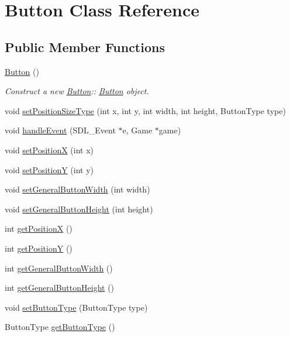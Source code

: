 \hypertarget{class_button}{}\section{Button Class Reference}
\label{class_button}
\subsection*{Public Member Functions}
\begin{DoxyCompactItemize}
\item 
\mbox{\label{class_button_a3b36df1ae23c58aedb9e15a713159459}} 
\mbox{\hyperlink{class_button_a3b36df1ae23c58aedb9e15a713159459}{Button}} ()
\begin{DoxyCompactList}\small\item\em Construct a new \mbox{\hyperlink{class_button}{Button}}\+:\+: \mbox{\hyperlink{class_button}{Button}} object. \end{DoxyCompactList}\item 
void \mbox{\hyperlink{class_button_a3abfce268def79881b95d7286a69ec19}{set\+Position\+Size\+Type}} (int x, int y, int width, int height, Button\+Type type)
\item 
void \mbox{\hyperlink{class_button_aa05597e01e195bb5901fc206bc0938a3}{handle\+Event}} (S\+D\+L\+\_\+\+Event $\ast$e, Game $\ast$game)
\item 
void \mbox{\hyperlink{class_button_addeed0141de6e58e0c5f94a4443f7103}{set\+PositionX}} (int x)
\item 
void \mbox{\hyperlink{class_button_a05e92fd7e167df2301247cc022d2694d}{set\+PositionY}} (int y)
\item 
void \mbox{\hyperlink{class_button_a15290e9b24eb7a52a698cc387670aed5}{set\+General\+Button\+Width}} (int width)
\item 
void \mbox{\hyperlink{class_button_aa3b0f5ac8b230e66983a83b6f4c8d440}{set\+General\+Button\+Height}} (int height)
\item 
int \mbox{\hyperlink{class_button_a9bcc23f4a459821144cb0ffdc7c6e338}{get\+PositionX}} ()
\item 
int \mbox{\hyperlink{class_button_a73237a0eeb7ae52d3f5d1c16eb794775}{get\+PositionY}} ()
\item 
int \mbox{\hyperlink{class_button_ac30c0f7242a6514c3b8a0d8b5c1135e6}{get\+General\+Button\+Width}} ()
\item 
int \mbox{\hyperlink{class_button_a577d80e982292d7b17584d11e650dca6}{get\+General\+Button\+Height}} ()
\item 
void \mbox{\hyperlink{class_button_a9d08f75c72f8ba5eddb857cbae0d4c77}{set\+Button\+Type}} (Button\+Type type)
\item 
Button\+Type \mbox{\hyperlink{class_button_afb53df1bb22e22c20d15b055cfa878dc}{get\+Button\+Type}} ()
\end{DoxyCompactItemize}


